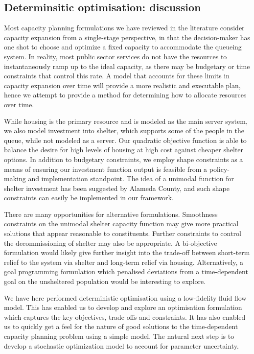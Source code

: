 \documentclass[12pt,a4paper]{article}
\begin{document}
\subsection{Determinsitic optimisation: discussion} \label{do-discuss}

Most capacity planning formulations we have reviewed in the literature consider capacity expansion from a single-stage perspective, in that the decision-maker has one shot to choose and optimize a fixed capacity to accommodate the queueing system.   In reality, most public sector services do not have the resources to instantaneously ramp up to the ideal capacity, as there may be budgetary or time constraints that control this rate.  A model that accounts for these limits in capacity expansion over time will provide a more realistic and executable plan, hence we attempt to provide a method for determining how to allocate resources over time.

While housing is the primary resource and is modeled as the main server system, we also model investment into shelter, which supports some of the people in the queue, while not modeled as a server. Our quadratic objective function is able to balance the desire for high levels of housing at high cost against cheaper shelter options. In addition to budgetary constraints, we employ shape constraints as a means of ensuring our investment function output is feasible from a policy-making and implementation standpoint.  The idea of a unimodal function for shelter investment has been suggested by Alameda County, and such shape constraints can easily be implemented in our framework.

There are many opportunities for alternative formulations.  Smoothness constraints on the unimodal shelter capacity function may give more practical solutions that appear reasonable to constituents. Further constraints to control the decommissioning of shelter may also be appropriate. A bi-objective formulation would likely give further insight into the trade-off between short-term relief to the system via shelter and long-term relief via housing. Alternatively, a goal programming formulation which penalised deviations from a time-dependent goal on the unsheltered population would be interesting to explore.

We have here performed deterministic optimisation using a low-fidelity fluid flow model. This has enabled us to develop and explore an optimisation formulation which captures the key objectives, trade offs and constraints. It has also enabled us to quickly get a feel for the nature of good solutions to the time-dependent capacity planning problem using a simple model. The natural next step is to develop a stochastic optimization model to account for parameter uncertainty.
\end{document}
